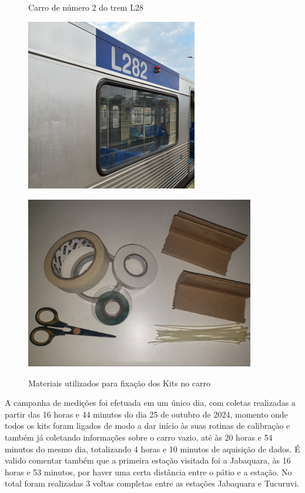 \documentclass[acronym,symbols,table]{fei}
\begin{document}
\begin{figure}[!htp] 
    \centering
    \begin{minipage}{0.45\textwidth}
        \caption{Carro de número 2 do trem L28}
        \includegraphics[width=\linewidth, height=7.5cm]{Imagens/metrol282.jpg} 
        \label{fig:metrol282}
    \end{minipage}\hfill
    \begin{minipage}{0.45\textwidth}
        \caption{Materiais utilizados para fixação dos Kits no carro}
        \includegraphics[width=\linewidth, height=7.5cm]{Imagens/matusados.jpeg} 
        \label{fig:matusados}
    \end{minipage}
\end{figure}

A campanha de medições foi efetuada em um único dia, com coletas realizadas a partir das 16 horas e 44 minutos do dia 25 de outubro de 2024, momento onde todos os kits foram ligados de modo a dar início às suas rotinas de calibração e também já coletando informações sobre o carro vazio, até às 20 horas e 54 minutos do mesmo dia, totalizando 4 horas e 10 minutos de aquisição de dados. É valido comentar também que a primeira estação visitada foi a Jabaquara, às 16 horas e 53 minutos, por haver uma certa distância entre o pátio e a estação. No total foram realizadas 3 voltas completas entre as estações Jabaquara e Tucuruvi.
\end{document}

